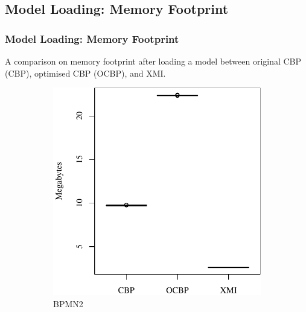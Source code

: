 \documentclass{beamer}
\begin{document}
\begin{frame}[fragile]
\section{Model Loading: Memory Footprint}
\frametitle{Model Loading: Memory Footprint}
A comparison on memory footprint after loading a model between original CBP (CBP), optimised CBP (OCBP), and XMI.
\begin{figure}[ht]
    \begin{subfigure}{0.325\textwidth}
        \centering
        \includegraphics[width=\linewidth]{load_memory_bpmn2}
        \caption{BPMN2}
        \label{fig:load_memory_bpmn2}
    \end{subfigure}
    \hfill
    \begin{subfigure}{0.325\textwidth}
        \centering

\end{subfigure}
\end{figure}
\end{frame}
\end{document}
